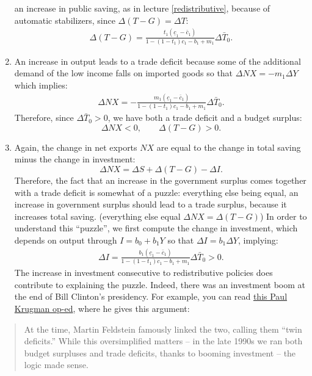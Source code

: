 \documentclass[]{book}
\begin{document}
\begin{enumerate}
  an increase in public saving, as in lecture \ref{redistributive},
  because of automatic stabilizers, since
  \(\Delta\left(T-G\right)=\Delta T\): \[
  \begin{aligned}
  \boxed{\Delta\left(T-G\right)=\frac{t_1\left(\underline{c}_{1}-\bar{c}_{1}\right)}{1-\left(1-t_{1}\right)c_{1}-b_{1}+m_1}\Delta\bar{T}_{0}}.
  \end{aligned}
  \]
\item
  An increase in output leads to a trade deficit because some of the
  additional demand of the low income falls on imported goods so that
  \(\Delta NX = -m_1 \Delta Y\) which implies: \[
  \begin{aligned}
  \boxed{\Delta NX =- \frac{m_1\left(\underline{c}_{1}-\bar{c}_{1}\right)}{1-\left(1-t_{1}\right)c_{1}-b_{1}+m_1}\Delta\bar{T}_{0}}.
  \end{aligned}
  \] Therefore, since \(\Delta\bar{T}_{0}>0\), we have both a trade
  deficit and a budget surplus:
  \[\boxed{\Delta NX <0, \qquad \Delta (T-G) > 0}.\]
\item
  Again, the change in net exports \(NX\) are equal to the change in
  total saving minus the change in investment:
  \[\Delta NX = \Delta S+ \Delta (T-G)- \Delta I.\] Therefore, the fact
  that an increase in the government surplus comes together with a trade
  deficit is somewhat of a puzzle: everything else being equal, an
  increase in government surplus should lead to a trade surplus, because
  it increases total saving. (everything else equal
  \(\Delta NX = \Delta (T-G)\)) In order to understand this ``puzzle'',
  we first compute the change in investment, which depends on output
  through \(I = b_0+b_1Y\) so that \(\Delta I = b_1 \Delta Y\),
  implying: \[
  \begin{aligned}
  \boxed{\Delta I=\frac{b_1\left(\underline{c}_{1}-\bar{c}_{1}\right)}{1-\left(1-t_{1}\right)c_{1}-b_{1}+m_1}\Delta\bar{T}_{0}>0}.
  \end{aligned}
  \] The increase in investment consecutive to redistributive policies
  does contribute to explaining the puzzle. Indeed, there was an
  investment boom at the end of Bill Clinton's presidency. For example,
  you can read
  \href{https://search.proquest.com/nytimes/docview/2002526277/AF5280E4BCB54A41PQ/}{this
  Paul Krugman op-ed}, where he gives this argument:
\end{enumerate}

\begin{quote}
At the time, Martin Feldstein famously linked the two, calling them
``twin deficits.'' While this oversimplified matters -- in the late
1990s we ran both budget surpluses and trade deficits, thanks to booming
investment -- the logic made sense.
\end{quote}
\end{document}
